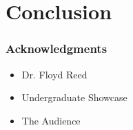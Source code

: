 \documentclass[11pt]{beamer}
\begin{document}
    \section{Conclusion}\label{sec:conclusion}
    \begin{frame}
        
    \end{frame}

    \begin{frame}
        \frametitle{Acknowledgments}
        \begin{itemize}
            \item Dr. Floyd Reed \medskip
            \item Undergraduate Showcase \medskip
            \item The Audience \medskip
        \end{itemize}
    \end{frame}

    \begin{frame}
    \end{frame}
\end{document}
